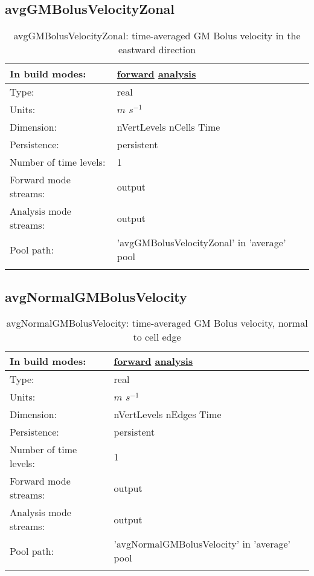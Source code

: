 \subsection[avgGMBolusVelocityZonal]{avgGMBolusVelocityZonal}
\label{subsec:var_sec_average_avgGMBolusVelocityZonal}
\begin{center}
\begin{longtable}{| p{2.0in} | p{4.0in} |}
        \hline 
        In build modes: & \hyperref[subsec:forward_var_tab_average]{forward} \hyperref[subsec:analysis_var_tab_average]{analysis} \\
        \hline 
        Type: & real \\
        \hline 
        Units: & $m$ $s^{-1}$ \\
        \hline 
        Dimension: & nVertLevels nCells Time \\
        \hline 
        Persistence: & persistent \\
        \hline 
        Number of time levels: & 1 \\
        \hline 
		 Forward mode streams: &  output \\
        \hline 
		 Analysis mode streams: &  output \\
        \hline 
            Pool path: & 'avgGMBolusVelocityZonal' in 'average' pool
 \\
		 \hline 
    \caption{avgGMBolusVelocityZonal: time-averaged GM Bolus velocity in the eastward direction}
\end{longtable}
\end{center}
\subsection[avgNormalGMBolusVelocity]{avgNormalGMBolusVelocity}
\label{subsec:var_sec_average_avgNormalGMBolusVelocity}
\begin{center}
\begin{longtable}{| p{2.0in} | p{4.0in} |}
        \hline 
        In build modes: & \hyperref[subsec:forward_var_tab_average]{forward} \hyperref[subsec:analysis_var_tab_average]{analysis} \\
        \hline 
        Type: & real \\
        \hline 
        Units: & $m$ $s^{-1}$ \\
        \hline 
        Dimension: & nVertLevels nEdges Time \\
        \hline 
        Persistence: & persistent \\
        \hline 
        Number of time levels: & 1 \\
        \hline 
		 Forward mode streams: &  output \\
        \hline 
		 Analysis mode streams: &  output \\
        \hline 
            Pool path: & 'avgNormalGMBolusVelocity' in 'average' pool
 \\
		 \hline 
    \caption{avgNormalGMBolusVelocity: time-averaged GM Bolus velocity, normal to cell edge}
\end{longtable}
\end{center}
